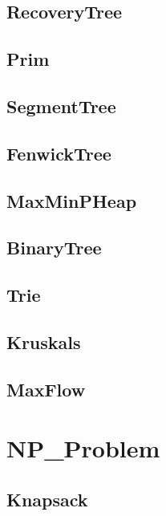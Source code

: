 \subsection{ RecoveryTree}
\raggedbottom
\hrulefill
\subsection{ Prim}
\raggedbottom
\hrulefill
\subsection{ SegmentTree}
\raggedbottom
\hrulefill
\subsection{ FenwickTree}
\raggedbottom
\hrulefill
\subsection{ MaxMinPHeap}
\raggedbottom
\hrulefill
\subsection{ BinaryTree}
\raggedbottom
\hrulefill
\subsection{ Trie}
\raggedbottom
\hrulefill
\subsection{ Kruskals}
\raggedbottom
\hrulefill
\subsection{ MaxFlow}
\raggedbottom
\hrulefill

\section{NP_Problem}
\subsection{ Knapsack}
\raggedbottom
\hrulefill


